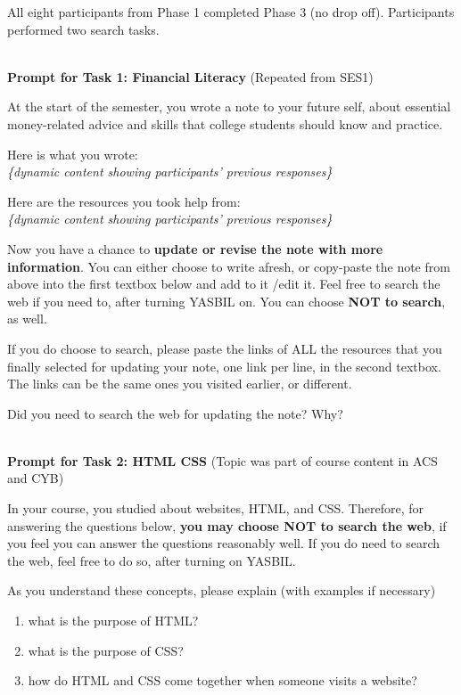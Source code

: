 \documentclass[letterpaper, nobind]{templates/ociamthesis}
\begin{document}
All eight participants from Phase 1 completed Phase 3 (no drop off).
Participants performed two search tasks.

~\\
\textbf{Prompt for Task 1: Financial Literacy} (Repeated from SES1)

At the start of the semester, you wrote a note to your future self,
about essential money-related advice and skills that college students
should know and practice.

Here is what you wrote:\\
\emph{\{dynamic content showing participants' previous responses\}}

Here are the resources you took help from:\\
\emph{\{dynamic content showing participants' previous responses\}}

Now you have a chance to \textbf{update or revise the note with more
information}. You can either choose to write afresh, or copy-paste the
note from above into the first textbox below and add to it /edit it.
Feel free to search the web if you need to, after turning YASBIL on. You
can choose \textbf{NOT to search}, as well.

If you do choose to search, please paste the links of ALL the resources
that you finally selected for updating your note, one link per line, in
the second textbox. The links can be the same ones you visited earlier,
or different.

Did you need to search the web for updating the note? Why?

~\\
\textbf{Prompt for Task 2: HTML CSS} (Topic was part of course content in ACS and CYB)

In your course, you studied about websites, HTML, and CSS. Therefore,
for answering the questions below, \textbf{you may choose NOT to search the
web}, if you feel you can answer the questions reasonably well. If you
do need to search the web, feel free to do so, after turning on YASBIL.

As you understand these concepts, please explain (with examples if
necessary)

\begin{enumerate}
\def\labelenumi{\arabic{enumi}.}
\item
  what is the purpose of HTML?
\item
  what is the purpose of CSS?
\item
  how do HTML and CSS come together when someone visits a website?
\end{enumerate}
\end{document}
